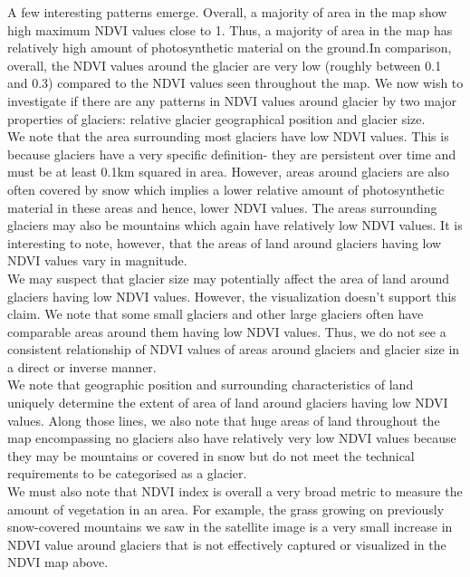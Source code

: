 \documentclass[11pt]{article}
\begin{document}
A few interesting patterns emerge. Overall, a majority of area in the map show high maximum NDVI values close to 1. Thus, a
majority of area in the map has relatively high amount of photosynthetic material on the ground.In comparison, overall, the NDVI values around the glacier are very low (roughly between 0.1
and 0.3) compared to the NDVI values seen throughout the map. We now wish to investigate if
there are any patterns in NDVI values around glacier by two major properties of glaciers:
relative glacier geographical position and glacier size.\\

We note that the area surrounding most glaciers have low NDVI values. This is because
glaciers have a very specific definition- they are persistent over time and must be at least 0.1km
squared in area. However, areas around glaciers are also often covered by snow which implies
a lower relative amount of photosynthetic material in these areas and hence, lower NDVI
values. The areas surrounding glaciers may also be mountains which again have relatively low
NDVI values. It is interesting to note, however, that the areas of land around glaciers having low
NDVI values vary in magnitude.\\

We may suspect that glacier size may potentially affect the area of land around glaciers having
low NDVI values. However, the visualization doesn’t support this claim. We note that some
small glaciers and other large glaciers often have comparable areas around them having low
NDVI values. Thus, we do not see a consistent relationship of NDVI values of areas around
glaciers and glacier size in a direct or inverse manner.\\

We note that geographic position and surrounding characteristics of land uniquely determine the
extent of area of land around glaciers having low NDVI values. Along those lines, we also note
that huge areas of land throughout the map encompassing no glaciers also have relatively very
low NDVI values because they may be mountains or covered in snow but do not meet the
technical requirements to be categorised as a glacier.\\

We must also note that NDVI index is overall a very broad metric to measure the amount of
vegetation in an area. For example, the grass growing on previously snow-covered mountains
we saw in the satellite image is a very small increase in NDVI value around glaciers that is not
effectively captured or visualized in the NDVI map above.\\
\end{document}
